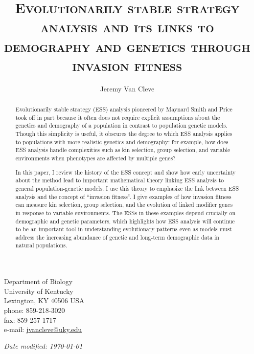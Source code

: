 \documentclass[11pt]{article}
\begin{document}
\begin{titlingpage}
\setlength{\droptitle}{2em}
\pretitle{\begin{center}\LARGE}
\posttitle{\par\end{center}\vskip 2.5em}

\title{\scshape Evolutionarily stable strategy analysis and its links to demography and genetics through invasion fitness}
\author{Jeremy Van Cleve}
\date{}
\maketitle

\vfill

\noindent
Department of Biology\\
University of Kentucky\\
Lexington, KY 40506 USA\\[1em]
phone: 859-218-3020\\
fax: 859-257-1717\\[1em]
e-mail: \href{mailto:jvancleve@uky.edu}{jvancleve@uky.edu}

\vspace{2em}

\begin{flushright} \textit{Date modified: \today} \end{flushright}
\end{titlingpage}

\linenumbers
\onehalfspacing
\begin{abstract}

  Evolutionarily stable strategy (ESS) analysis pioneered by Maynard Smith and Price took off in part because it often does not require explicit assumptions about the genetics and demography of a population in contrast to population genetic models. Though this simplicity is useful, it obscures the degree to which ESS analysis applies to populations with more realistic genetics and demography: for example, how does ESS analysis handle complexities such as kin selection, group selection, and variable environments when phenotypes are affected by multiple genes?

  In this paper, I review the history of the ESS concept and show how early uncertainty about the method lead to important mathematical theory linking ESS analysis to general population-genetic models. I use this theory to emphasize the link between ESS analysis and the concept of ``invasion fitness''. I give examples of how invasion fitness can measure kin selection, group selection, and the evolution of linked modifier genes in response to variable environments. The ESSs in these examples depend crucially on demographic and genetic parameters, which highlights how ESS analysis will continue to be an important tool in understanding evolutionary patterns even as models must address the increasing abundance of genetic and long-term demographic data in natural populations.

\end{abstract}
\end{document}

